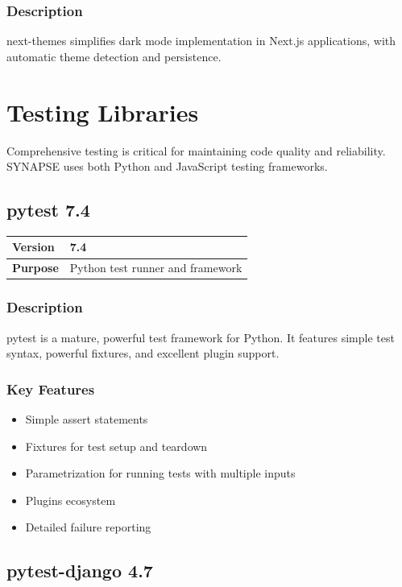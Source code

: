 \documentclass[12pt,a4paper]{report}
\begin{document}
\subsection{Description}

next-themes simplifies dark mode implementation in Next.js applications, with automatic theme detection and persistence.

\chapter{Testing Libraries}

Comprehensive testing is critical for maintaining code quality and reliability. SYNAPSE uses both Python and JavaScript testing frameworks.

\section{pytest 7.4}

\begin{tabular}{|p{4cm}|p{10cm}|}
\hline
\textbf{Version} & 7.4 \\
\hline
\textbf{Purpose} & Python test runner and framework \\
\hline
\end{tabular}

\subsection{Description}

pytest is a mature, powerful test framework for Python. It features simple test syntax, powerful fixtures, and excellent plugin support.

\subsection{Key Features}

\begin{itemize}
    \item Simple assert statements
    \item Fixtures for test setup and teardown
    \item Parametrization for running tests with multiple inputs
    \item Plugins ecosystem
    \item Detailed failure reporting
\end{itemize}

\section{pytest-django 4.7}
\end{document}
